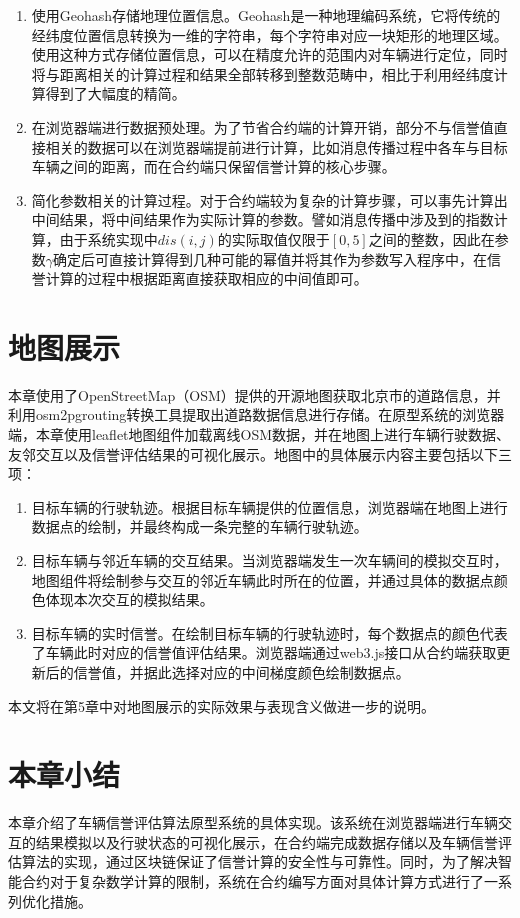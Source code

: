 \begin{enumerate}
    \item 使用Geohash存储地理位置信息。Geohash是一种地理编码系统，它将传统的经纬度位置信息转换为一维的字符串，每个字符串对应一块矩形的地理区域\cite{lwq}。使用这种方式存储位置信息，可以在精度允许的范围内对车辆进行定位，同时将与距离相关的计算过程和结果全部转移到整数范畴中，相比于利用经纬度计算得到了大幅度的精简。
    \item 在浏览器端进行数据预处理。为了节省合约端的计算开销，部分不与信誉值直接相关的数据可以在浏览器端提前进行计算，比如消息传播过程中各车与目标车辆之间的距离，而在合约端只保留信誉计算的核心步骤。
    \item 简化参数相关的计算过程。对于合约端较为复杂的计算步骤，可以事先计算出中间结果，将中间结果作为实际计算的参数。譬如消息传播中涉及到的指数计算，由于系统实现中$dis(i,j)$的实际取值仅限于$[0,5]$之间的整数，因此在参数$\gamma$确定后可直接计算得到几种可能的幂值并将其作为参数写入程序中，在信誉计算的过程中根据距离直接获取相应的中间值即可。
\end{enumerate}

\section{地图展示}
本章使用了OpenStreetMap（OSM）\cite{osm}提供的开源地图获取北京市的道路信息，并利用osm2pgrouting\cite{pg}转换工具提取出道路数据信息进行存储。在原型系统的浏览器端，本章使用leaflet地图组件加载离线OSM数据，并在地图上进行车辆行驶数据、友邻交互以及信誉评估结果的可视化展示。地图中的具体展示内容主要包括以下三项：
\begin{enumerate}
    \item 目标车辆的行驶轨迹。根据目标车辆提供的位置信息，浏览器端在地图上进行数据点的绘制，并最终构成一条完整的车辆行驶轨迹。
    \item 目标车辆与邻近车辆的交互结果。当浏览器端发生一次车辆间的模拟交互时，地图组件将绘制参与交互的邻近车辆此时所在的位置，并通过具体的数据点颜色体现本次交互的模拟结果。
    \item 目标车辆的实时信誉。在绘制目标车辆的行驶轨迹时，每个数据点的颜色代表了车辆此时对应的信誉值评估结果。浏览器端通过web3.js接口从合约端获取更新后的信誉值，并据此选择对应的中间梯度颜色绘制数据点。
\end{enumerate}
本文将在第5章中对地图展示的实际效果与表现含义做进一步的说明。

\section{本章小结}
本章介绍了车辆信誉评估算法原型系统的具体实现。该系统在浏览器端进行车辆交互的结果模拟以及行驶状态的可视化展示，在合约端完成数据存储以及车辆信誉评估算法的实现，通过区块链保证了信誉计算的安全性与可靠性。同时，为了解决智能合约对于复杂数学计算的限制，系统在合约编写方面对具体计算方式进行了一系列优化措施。